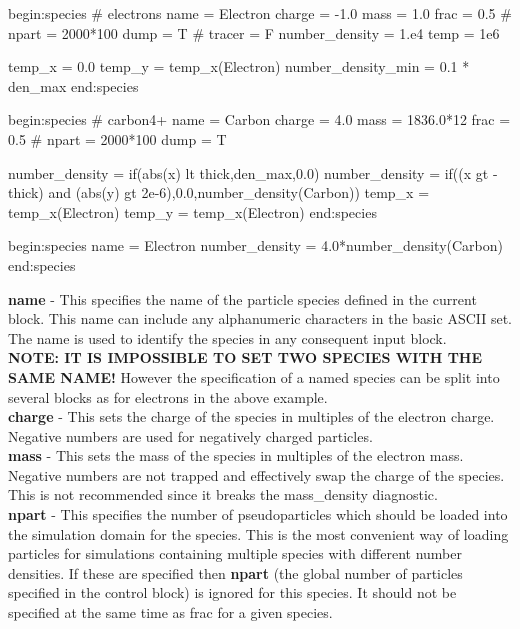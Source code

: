 \documentclass[12pt,a4paper]{article}
\newcommand{\emphtext}{\color{warwickdark} \fontfamily{phv}\selectfont\large\bf}
\newcommand{\inlineemph}[1]{{\color{warwicklight} \bf{#1}}}
\newenvironment{lboxverbatim}[1]{
\setlength{\FrameSep}{0pt}
\def\FrameCommand{\fboxsep=0pt \colorbox{shadecolor}}
\MakeFramed{\FrameRestore}
\vspace{-13.5pt}
\fvset{label=#1}
\boxverb
}{
\endboxverb
\vspace{-13.5pt}
\endMakeFramed
}
\begin{document}
\begin{lboxverbatim}{species block}
begin:species
   # electrons
   name = Electron
   charge = -1.0
   mass = 1.0
   frac = 0.5
   # npart = 2000*100
   dump = T
   # tracer = F
   number_density = 1.e4
   temp = 1e6

   temp_x = 0.0
   temp_y = temp_x(Electron)
   number_density_min = 0.1 * den_max
end:species

begin:species
   # carbon4+
   name = Carbon
   charge = 4.0
   mass = 1836.0*12
   frac = 0.5
   # npart = 2000*100
   dump = T

   number_density = if(abs(x) lt thick,den_max,0.0)
   number_density = if((x gt -thick) and (abs(y) gt 2e-6),0.0,number_density(Carbon))
   temp_x = temp_x(Electron)
   temp_y = temp_x(Electron)
end:species

begin:species
   name = Electron
   number_density = 4.0*number_density(Carbon)
end:species
\end{lboxverbatim}

{\emphtext name} - This specifies the name of the particle species defined
in the current block. This name can include any alphanumeric characters in
the basic ASCII set. The name is used to identify the species in any
consequent input block.\\

{\emphtext NOTE: IT IS IMPOSSIBLE TO SET TWO SPECIES WITH THE SAME NAME!}
However the specification of a named species can be split into several blocks
as for electrons in the above example.\\

{\emphtext charge} - This sets the charge of the species in
multiples of the electron charge. Negative numbers are used for negatively
charged particles.\\

{\emphtext mass} - This sets the mass of the species in multiples
of the electron mass. Negative numbers are not trapped and effectively swap the
charge of the species. This is not recommended since it breaks the
mass\_density diagnostic.\\

{\emphtext npart} - This specifies the number of pseudoparticles
which should be loaded into the simulation domain for the species. This is the
most convenient way of loading particles for simulations containing multiple
species with different number densities. If these are specified then
\inlineemph{npart} (the global number of particles specified in the control
block) is ignored for this species. It should not be specified at the same time
as frac for a given species.\\
\end{document}
